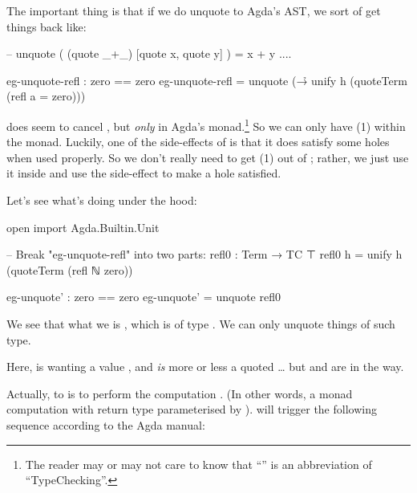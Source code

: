\documentclass{article}
\newcommand{\superEmph}{\emph}
\begin{document}
The important thing is that if we do unquote to Agda's AST, we sort of get things back like:

\begin{code}
-- unquote ( (quote _+_) [quote x, quote y] ) = x + y ....
\end{code}

\begin{code}
eg-unquote-refl : zero == zero
eg-unquote-refl = unquote (\h → unify h (quoteTerm (refl {a = zero})))
\end{code}

 does seem to cancel , but \superEmph{only} in Agda's  monad.\footnote{The reader may or may not care to know that ``'' is an abbreviation of ``TypeChecking''.} So we can only have (1) within the  monad. Luckily, one of the side-effects of  is that it does satisfy some holes when used properly. So we don't really need to get (1) out of ; rather, we just use it inside and use the side-effect to make a hole satisfied.

Let's see what's  doing under the hood:

\begin{code}
open import Agda.Builtin.Unit

-- Break "eg-unquote-refl" into two parts:
refl0 : Term → TC ⊤
refl0 h = unify h (quoteTerm (refl {ℕ} {zero}))

eg-unquote' : zero == zero
eg-unquote' = unquote refl0
\end{code}

We see that what we  is , which is of type    . We can only unquote things of such type.

Here,  is wanting a value , and  \emph{is} more or less a quoted \ldots{} but  and  are in the way.

Actually, to  is to perform the computation  \AgdaSymbol{:}    . (In other words, a  monad computation with return type  parameterised by ).  will trigger the following sequence according to the Agda manual:
\end{document}
